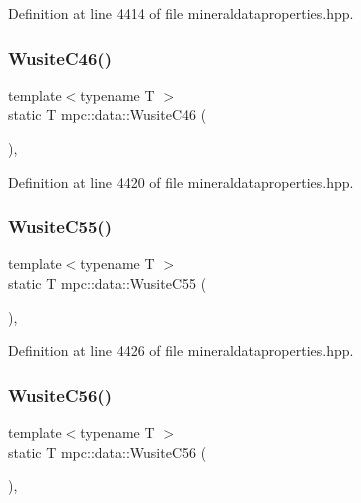 Definition at line 4414 of file mineraldataproperties.\+hpp.

\mbox{\label{namespacempc_1_1data_ab8e71b9d408ba45259e3a8771930621d}} 
\subsubsection{\texorpdfstring{Wusite\+C46()}{WusiteC46()}}
{\footnotesize\ttfamily template$<$typename T $>$ \\
static T mpc\+::data\+::\+Wusite\+C46 (\begin{DoxyParamCaption}{ }\end{DoxyParamCaption})\hspace{0.3cm}{\ttfamily [inline]}, {\ttfamily [static]}}



Definition at line 4420 of file mineraldataproperties.\+hpp.

\mbox{\label{namespacempc_1_1data_aa93a5d1fd8af0d73f89dabd505b02321}} 
\subsubsection{\texorpdfstring{Wusite\+C55()}{WusiteC55()}}
{\footnotesize\ttfamily template$<$typename T $>$ \\
static T mpc\+::data\+::\+Wusite\+C55 (\begin{DoxyParamCaption}{ }\end{DoxyParamCaption})\hspace{0.3cm}{\ttfamily [inline]}, {\ttfamily [static]}}



Definition at line 4426 of file mineraldataproperties.\+hpp.

\mbox{\label{namespacempc_1_1data_a5796a16a770ca573c478a2d26c3b0529}} 
\subsubsection{\texorpdfstring{Wusite\+C56()}{WusiteC56()}}
{\footnotesize\ttfamily template$<$typename T $>$ \\
static T mpc\+::data\+::\+Wusite\+C56 (\begin{DoxyParamCaption}{ }\end{DoxyParamCaption})\hspace{0.3cm}{\ttfamily [inline]}, {\ttfamily [static]}}



